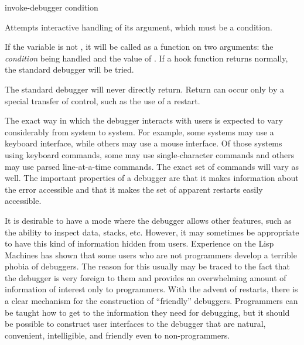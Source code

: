 \begin{defun}[Function]
invoke-debugger condition

  Attempts interactive handling of its argument, which must be a condition.

  If the variable  is not , it will be called as a function on two
  arguments: the {\it condition} being handled and the value of .
  If a hook function returns normally, the standard debugger will be tried.

  The standard debugger will never directly return. Return can occur only by a
  special transfer of control, such as the use of a restart.

\beforenoterule
\begin{sideremark}
    The exact way in which the debugger interacts with users is expected to
    vary considerably from system to system. For example, some systems may
    use a keyboard interface, while others may use a mouse interface. Of those
    systems using keyboard commands, some may use single-character commands
    and others may use parsed line-at-a-time commands. The exact set of commands
    will vary as well. The important properties of a debugger are that
it makes information about the error accessible and that
it makes the set of apparent restarts easily accessible.

    It is desirable to have a mode where the debugger allows other features,
    such as the ability to inspect data, stacks, etc. However, it may
    sometimes be appropriate to have this kind of information hidden from
    users. Experience on the Lisp Machines has shown that some users who are
    not programmers develop a terrible phobia of debuggers. The reason for
    this usually may be traced to the fact that the debugger is very foreign to them
    and provides an overwhelming amount of information of
    interest only to programmers. With the advent of restarts, there is a clear
    mechanism for the construction of ``friendly'' debuggers. Programmers can
    be taught how to get to the information they need for debugging, but it
    should be possible to construct user interfaces to the debugger that are
    natural, convenient, intelligible, and friendly even to non-programmers.
\end{sideremark}
\afternoterule
\end{defun}

